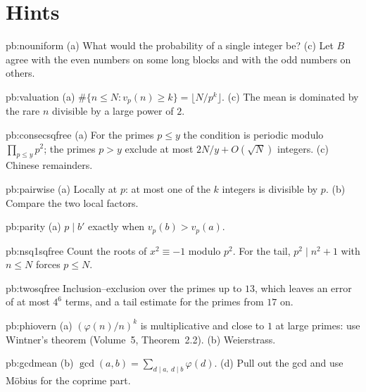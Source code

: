 \section{Hints}

\begin{hint}{pb:nouniform}
(a) What would the probability of a single integer be? (c) Let $B$ agree with the even numbers on some long blocks and with the
odd numbers on others.
\end{hint}

\begin{hint}{pb:valuation}
(a) $\#\{n\le N:v_p(n)\ge k\}=\lfloor N/p^k\rfloor$. (c) The mean is dominated by the rare $n$ divisible by a large power of $2$.
\end{hint}

\begin{hint}{pb:consecsqfree}
(a) For the primes $p\le y$ the condition is periodic modulo $\prod_{p\le y}p^2$; the primes $p>y$ exclude at most $2N/y+O(\sqrt N)$
integers. (c) Chinese remainders.
\end{hint}

\begin{hint}{pb:pairwise}
(a) Locally at $p$: at most one of the $k$ integers is divisible by $p$. (b) Compare the two local factors.
\end{hint}

\begin{hint}{pb:parity}
(a) $p\mid b'$ exactly when $v_p(b)>v_p(a)$.
\end{hint}

\begin{hint}{pb:nsq1sqfree}
Count the roots of $x^2\equiv-1$ modulo $p^2$. For the tail, $p^2\mid n^2+1$ with $n\le N$ forces $p\le N$.
\end{hint}

\begin{hint}{pb:twosqfree}
Inclusion--exclusion over the primes up to $13$, which leaves an error of at most $4^6$ terms, and a tail estimate for the
primes from $17$ on.
\end{hint}

\begin{hint}{pb:phiovern}
(a) $(\varphi(n)/n)^k$ is multiplicative and close to $1$ at large primes: use Wintner's theorem (Volume~5, Theorem~2.2).
(b) Weierstrass.
\end{hint}

\begin{hint}{pb:gcdmean}
(b) $\gcd(a,b)=\sum_{d\mid a,\ d\mid b}\varphi(d)$. (d) Pull out the gcd and use Möbius for the coprime part.
\end{hint}

